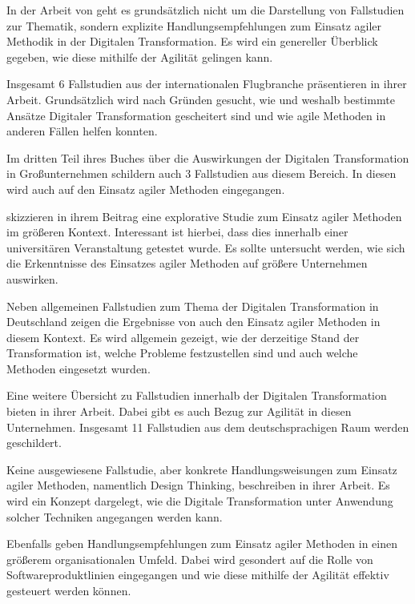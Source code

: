 In der Arbeit von  geht es grundsätzlich nicht um die Darstellung von Fallstudien zur Thematik, sondern explizite Handlungsempfehlungen zum Einsatz agiler Methodik in der Digitalen Transformation. Es wird ein genereller Überblick gegeben, wie diese mithilfe der Agilität gelingen kann.

Insgesamt 6 Fallstudien aus der internationalen Flugbranche präsentieren  in ihrer Arbeit. Grundsätzlich wird nach Gründen gesucht, wie und weshalb bestimmte Ansätze Digitaler Transformation gescheitert sind und wie agile Methoden in anderen Fällen helfen konnten.

Im dritten Teil ihres Buches über die Auswirkungen der Digitalen Transformation in Großunternehmen schildern  auch 3 Fallstudien aus diesem Bereich. In diesen wird auch auf den Einsatz agiler Methoden eingegangen. 

 skizzieren in ihrem Beitrag eine explorative Studie zum Einsatz agiler Methoden im größeren Kontext. Interessant ist hierbei, dass dies innerhalb einer universitären Veranstaltung getestet wurde. Es sollte untersucht werden, wie sich die Erkenntnisse des Einsatzes agiler Methoden auf größere  Unternehmen auswirken.

Neben allgemeinen Fallstudien zum Thema der Digitalen Transformation in Deutschland zeigen die Ergebnisse von  auch den Einsatz agiler Methoden in diesem Kontext.  Es wird allgemein gezeigt, wie der derzeitige Stand der Transformation ist, welche Probleme festzustellen sind und auch welche Methoden eingesetzt wurden.

Eine weitere Übersicht zu Fallstudien innerhalb der Digitalen Transformation bieten  in ihrer Arbeit. Dabei gibt es auch Bezug zur Agilität in diesen Unternehmen. Insgesamt 11 Fallstudien aus dem deutschsprachigen Raum werden geschildert.

Keine ausgewiesene Fallstudie, aber konkrete Handlungsweisungen zum Einsatz agiler Methoden, namentlich Design Thinking, beschreiben  in ihrer Arbeit. Es wird ein Konzept dargelegt, wie die Digitale Transformation unter Anwendung solcher Techniken angegangen werden kann.

Ebenfalls geben  Handlungsempfehlungen zum Einsatz agiler Methoden in einen größerem organisationalen Umfeld. Dabei wird gesondert auf die Rolle von Softwareproduktlinien eingegangen und wie diese mithilfe der Agilität effektiv gesteuert werden können.

